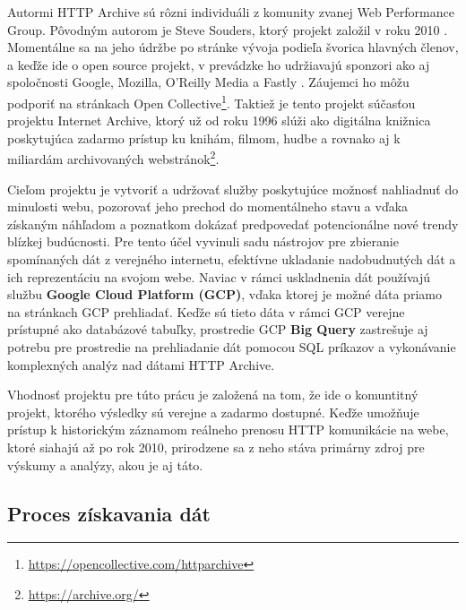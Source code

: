 Autormi HTTP Archive sú rôzni individuáli z komunity zvanej Web Performance Group. Pôvodným autorom je Steve Souders, ktorý projekt založil v roku 2010 \cite{httparchive-faq}.
Momentálne sa na jeho údržbe po stránke vývoja podieľa švorica hlavných členov, a keďže ide o open source projekt, v prevádzke ho udržiavajú sponzori ako aj spoločnosti Google, Mozilla, O'Reilly Media a Fastly \cite{httparchive-about}. Záujemci ho môžu podporiť na stránkach Open Collective\footnote{\href{https://opencollective.com/httparchive}{https://opencollective.com/httparchive}}.
Taktiež je tento projekt súčasťou projektu Internet Archive, ktorý už od roku 1996 slúži ako digitálna knižnica poskytujúca zadarmo prístup ku knihám, filmom, hudbe a rovnako aj k miliardám archivovaných webstránok\footnote{\href{https://archive.org/}{https://archive.org/}}.

Cieľom projektu je vytvoriť a udržovať služby poskytujúce možnosť nahliadnuť do minulosti webu, pozorovať jeho prechod do momentálneho stavu a vďaka získaným náhľadom a poznatkom dokázať
predpovedať potencionálne nové trendy blízkej budúcnosti. 
Pre tento účel vyvinuli sadu nástrojov pre zbieranie spomínaných dát z verejného internetu, efektívne ukladanie nadobudnutých dát a ich reprezentáciu na svojom webe.
Naviac v rámci uskladnenia dát používajú službu \textbf{Google Cloud Platform (GCP)}, vďaka ktorej je možné dáta priamo na stránkach GCP prehliadať.
Keďže sú tieto dáta v rámci GCP verejne prístupné ako databázové tabuľky, prostredie GCP \textbf{Big Query} zastrešuje aj potrebu pre prostredie na prehliadanie dát pomocou SQL príkazov 
a vykonávanie komplexných analýz nad dátami HTTP Archive.

Vhodnosť projektu pre túto prácu je založená na tom, že ide o komuntitný projekt, ktorého výsledky sú verejne a zadarmo dostupné. Keďže umožňuje prístup k historickým záznamom reálneho prenosu HTTP komunikácie na webe, ktoré siahajú až po rok 2010, prirodzene sa z neho stáva primárny zdroj pre výskumy a analýzy, akou je aj táto.

\subsection{Proces získavania dát}

